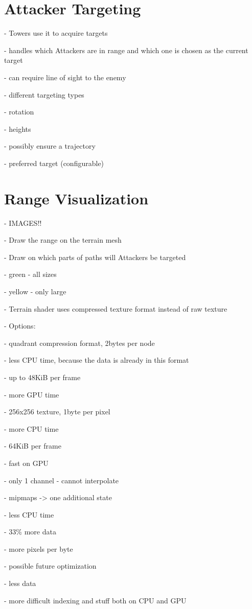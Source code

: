 \section{Attacker Targeting}

- Towers use it to acquire targets

- handles which Attackers are in range and which one is chosen as the current target

- can require line of sight to the enemy

- different targeting types

- rotation

- heights

- possibly ensure a trajectory

- preferred target (configurable)

\section{Range Visualization}

- IMAGES!!

- Draw the range on the terrain mesh

- Draw on which parts of paths will Attackers be targeted

- green - all sizes

- yellow - only large

- Terrain shader uses compressed texture format instead of raw texture

- Options:

- quadrant compression format, 2bytes per node

- less CPU time, because the data is already in this format

- up to 48KiB per frame

- more GPU time

- 256x256 texture, 1byte per pixel

- more CPU time

- 64KiB per frame

- fast on GPU

- only 1 channel - cannot interpolate

- mipmaps -> one additional state

- less CPU time

- 33\% more data

- more pixels per byte

- possible future optimization

- less data

- more difficult indexing and stuff both on CPU and GPU


